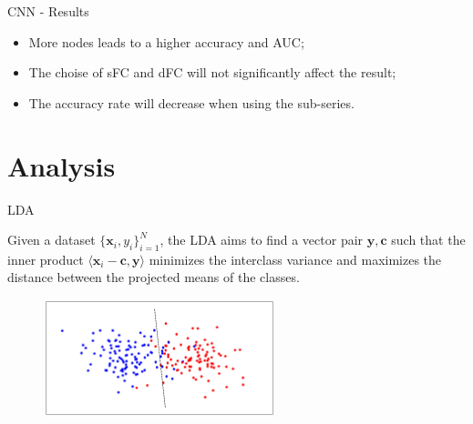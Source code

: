 \documentclass{beamer}
\begin{document}
\begin{frame}{CNN - Results}

    \begin{itemize}
        \item More nodes leads to a higher accuracy and AUC;
        \item The choise of sFC and dFC will not significantly affect the result;
        \item The accuracy rate will decrease when using the sub-series.
    \end{itemize}

\end{frame}

\section{Analysis}
\begin{frame}{LDA}

    Given a dataset $\{ \mathbf{x}_i, y_i \}_{i=1}^N$, the LDA aims to find a vector pair $\mathbf{y}, \mathbf{c}$ such that the inner product $\langle \mathbf{x}_i - \mathbf{c}, \mathbf{y} \rangle$ minimizes the interclass variance and maximizes the distance between the projected means of the classes.

    \begin{figure}[H]
        \centering
        \includegraphics[width=0.6\textwidth]{./figure/lda.jpg}
    \end{figure}

\end{frame}
\end{document}

